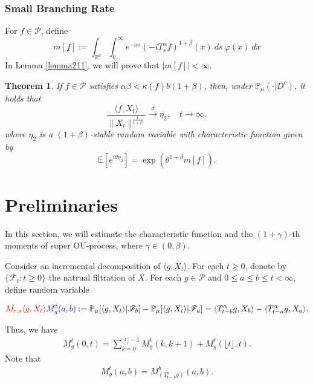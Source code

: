 \documentclass[12pt,oneside,english]{amsart}
\theoremstyle{plain}
\newtheorem{thm}{Theorem}[section]
\theoremstyle{definition}
\numberwithin{equation}{section}
\newcommand{\added}[1]{{\color{blue}#1}}\newcommand{\deleted}[1]{{\color{red}#1}}
\begin{document}
\subsubsection{Small Branching Rate}

For $f\in \mathcal{P}$, define
$$m[f]:=\int_{\mathbb{R}^d}\int_0^{\infty} e^{-\alpha s}(-iT_{s}^{\alpha}f)^{1+\beta}(x)~ds~\varphi(x)~dx$$
In Lemma \ref{lemma211}, we will prove that $|m[f]|<\infty$.
\begin{thm}\label{Theorem13}
    If $f\in\mathcal{P}$ satisfies  $\alpha\beta<\kappa(f)b(1+\beta)$, then, under $\mathbb{P}_{\mu}(\cdot|D^c)$, it holds that
    $$\frac{\langle f,X_t\rangle}{\|X_t\|^{\frac{1}{1+\beta}}}\xrightarrow{d} \eta_2, \quad t\rightarrow \infty,$$
    where $\eta_2$ is a $(1+\beta)$-stable random variable with characteristic function given by
    $$\mathbb{E} [e^{i\theta \eta_2}]=\exp(\theta^{1+\beta}m[f]).$$
\end{thm}

\section{Preliminaries}
    In this section, we will estimate the characteristic function and the $(1+\gamma)$-th moments of super OU-process, where $\gamma \in (0,\beta)$.

    Consider an incremental decomposition of $\langle g,X_t \rangle$.
    For each $t\geq 0$, denote by $\{\mathscr{F}_t:t\geq 0\}$ the natrual filtration of $X$.
    For each $g\in \mathcal P$ and $0 \leq a \leq b \leq t <\infty$, define random variable

\[
   \deleted{ M_{r,s}\langle g,X_t\rangle} \added{M_g^t(a,b)}
    := \mathbb P_{\mu}[\langle g,X_t\rangle|\mathscr F_b] - \mathbb P_{\mu}[\langle g,X_t\rangle|\mathscr F_a]
    =\langle T_{t-b}^\alpha g, X_b\rangle - \langle T_{t-a}^\alpha g, X_a\rangle.
\]


    Thus, we have
\begin{align}
    M^t_g(0,t)
    = \sum_{k = 0}^{\lfloor t \rfloor - 1} M^t_g(k,k+1) + M^t_g(\lfloor t \rfloor, t).
\end{align}
    Note that
\begin{align}
    M_g^t(a,b) = M_{(T_{t-b}^\alpha g)}^b (a,b).
\end{align}
\end{document}
